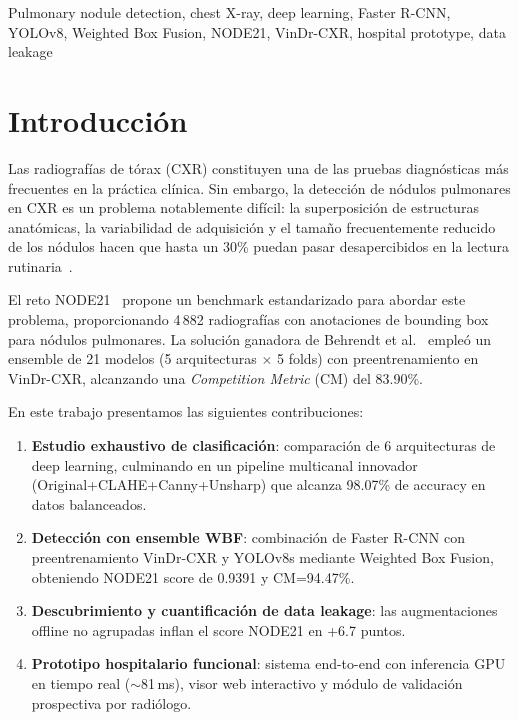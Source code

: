 \documentclass[conference]{IEEEtran}
\begin{document}
\begin{IEEEkeywords}
Pulmonary nodule detection, chest X-ray, deep learning, Faster R-CNN, YOLOv8, Weighted Box Fusion, NODE21, VinDr-CXR, hospital prototype, data leakage
\end{IEEEkeywords}

\section{Introducción}

Las radiografías de tórax (CXR) constituyen una de las pruebas diagnósticas más frecuentes en la práctica clínica. Sin embargo, la detección de nódulos pulmonares en CXR es un problema notablemente difícil: la superposición de estructuras anatómicas, la variabilidad de adquisición y el tamaño frecuentemente reducido de los nódulos hacen que hasta un 30\% puedan pasar desapercibidos en la lectura rutinaria~\cite{behrendt2023}.

El reto NODE21~\cite{node21} propone un benchmark estandarizado para abordar este problema, proporcionando 4\,882 radiografías con anotaciones de bounding box para nódulos pulmonares. La solución ganadora de Behrendt et al.~\cite{behrendt2023} empleó un ensemble de 21 modelos (5 arquitecturas $\times$ 5 folds) con preentrenamiento en VinDr-CXR, alcanzando una \textit{Competition Metric} (CM) del 83.90\%.

En este trabajo presentamos las siguientes contribuciones:

\begin{enumerate}
    \item \textbf{Estudio exhaustivo de clasificación}: comparación de 6 arquitecturas de deep learning, culminando en un pipeline multicanal innovador (Original+CLAHE+Canny+Unsharp) que alcanza 98.07\% de accuracy en datos balanceados.
    \item \textbf{Detección con ensemble WBF}: combinación de Faster R-CNN con preentrenamiento VinDr-CXR y YOLOv8s mediante Weighted Box Fusion, obteniendo NODE21 score de 0.9391 y CM=94.47\%.
    \item \textbf{Descubrimiento y cuantificación de data leakage}: las augmentaciones offline no agrupadas inflan el score NODE21 en +6.7 puntos.
    \item \textbf{Prototipo hospitalario funcional}: sistema end-to-end con inferencia GPU en tiempo real ($\sim$81\,ms), visor web interactivo y módulo de validación prospectiva por radiólogo.
\end{enumerate}
\end{document}
